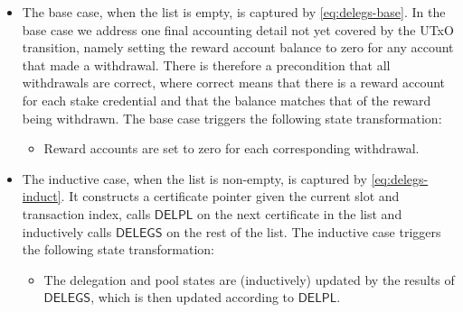 \begin{itemize}
\item The base case, when the list is empty, is captured by
  \cref{eq:delegs-base}.  In the base case we address one final accounting
  detail not yet covered by the UTxO transition, namely setting the reward
  account balance to zero for any account that made a withdrawal.  There is
  therefore a precondition that all withdrawals are correct, where correct means
  that there is a reward account for each stake credential and that the balance
  matches that of the reward being withdrawn.  The base case triggers the
  following state transformation:
    \begin{itemize}
      \item Reward accounts are set to zero for each corresponding withdrawal.
    \end{itemize}
  \item The inductive case, when the list is non-empty, is captured by \cref{eq:delegs-induct}.
    It constructs a certificate pointer given the current slot and transaction index,
    calls $\mathsf{DELPL}$ on the next certificate in the list and inductively
    calls $\mathsf{DELEGS}$ on the rest of the list.
    The inductive case triggers the following state transformation:
    \begin{itemize}
      \item The delegation and pool states are (inductively) updated by the results of
        $\mathsf{DELEGS}$, which is then updated according to $\mathsf{DELPL}$.
    \end{itemize}
\end{itemize}

